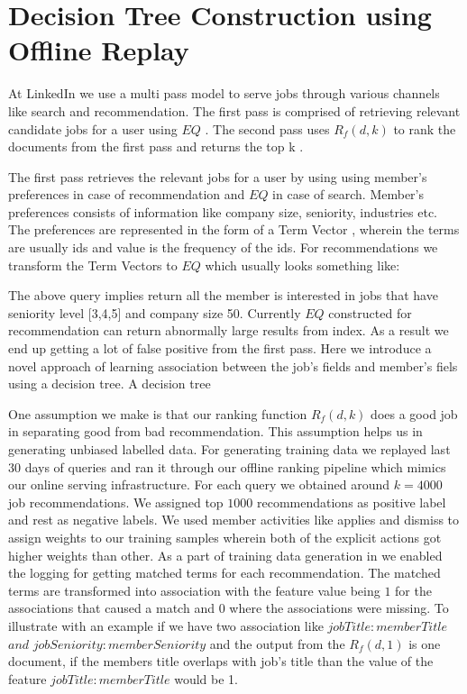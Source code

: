 \section{Decision Tree Construction using Offline Replay}

At LinkedIn we use a multi pass model to serve jobs through various channels like search and recommendation. The first pass is comprised of retrieving relevant candidate jobs for a user using $EQ$ . The second pass uses  $R_f(d, k)$ to rank the documents from the first pass and returns the top k . 

The first pass retrieves the relevant jobs for a user by using using member's preferences in case of recommendation and $EQ$ in case of search. Member's preferences consists of information like company size, seniority, industries etc. The preferences are  represented  in the form of a Term Vector , wherein the terms are usually ids and value is the frequency of the ids. For recommendations we transform the Term Vectors to $EQ$  which usually looks something like:


The above query implies return all the member is interested in jobs that have seniority level [3,4,5] and company size 50. Currently $EQ$ constructed for recommendation can return abnormally large results from index. As a result we end up getting a lot of false positive from the first pass. Here we introduce a novel approach of learning association between the job's fields and member's fiels using a decision tree. A decision tree 

One assumption we make is that our ranking function $R_f(d, k)$  does a good job in separating good from bad recommendation. This assumption helps us in generating unbiased labelled data. For generating training data we replayed last 30 days of queries and ran it through our offline ranking pipeline which mimics our online serving infrastructure. For each query we obtained around  $k = 4000$ job recommendations. We assigned top $1000$ recommendations as positive label and rest  as negative labels. We used member activities like applies and dismiss to assign weights to our training samples wherein both of the explicit actions got higher weights than other. As a part of training data generation in we enabled the logging for getting matched terms for each recommendation. The matched terms are transformed into association with the feature value being $1$ for the associations that caused a match and $0$ where the associations were missing. To illustrate with an example if we have two association like $jobTitle : memberTitle$ $and$ $jobSeniority : memberSeniority$ and the output from the $R_f(d, 1)$ is  one document, if the members title overlaps with job's title than the value of the feature $jobTitle : memberTitle$ would be 1.

